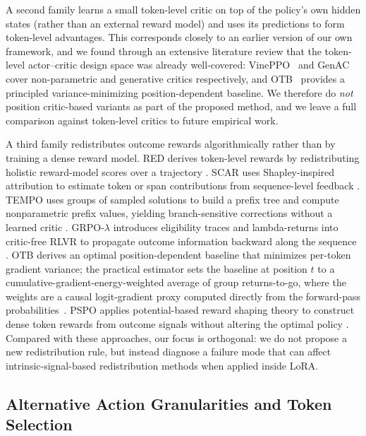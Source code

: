 A second family learns a small token-level critic on top of the policy's own hidden
states (rather than an external reward model) and uses its predictions to form
token-level advantages. This corresponds closely to an earlier version of our own
framework, and we found through an extensive literature review that the token-level
actor--critic design space was already well-covered: VinePPO~\cite{kazemnejad2024vineppo}
and GenAC~\cite{shan2026genac} cover non-parametric and generative critics
respectively, and OTB~\cite{li2026otb} provides a principled variance-minimizing
position-dependent baseline. We therefore do \emph{not} position critic-based
variants as part of the proposed method, and we leave a full comparison against
token-level critics to future empirical work.

A third family redistributes outcome rewards algorithmically rather than by training a
dense reward model. RED derives token-level rewards by redistributing holistic
reward-model scores over a trajectory \cite{li2024red}. SCAR uses Shapley-inspired
attribution to estimate token or span contributions from sequence-level feedback
\cite{cao2025scar,shapley1953value}. TEMPO uses groups of sampled solutions to build a
prefix tree and compute nonparametric prefix values, yielding branch-sensitive
corrections without a learned critic \cite{tran2025tempo}. GRPO-$\lambda$ introduces
eligibility traces and lambda-returns into critic-free RLVR to propagate outcome
information backward along the sequence \cite{parthasarathi2025grpolambda}. OTB derives
an optimal position-dependent baseline that minimizes per-token gradient
variance; the practical estimator sets the baseline at position $t$ to a
cumulative-gradient-energy-weighted average of group returns-to-go, where the
weights are a causal logit-gradient proxy computed directly from the
forward-pass probabilities~\cite{li2026otb}. PSPO applies potential-based reward
shaping theory to construct dense token rewards from outcome signals without altering
the optimal policy \cite{hu2026pspo}. Compared with these approaches, our focus is
orthogonal: we do not propose a new redistribution rule, but instead diagnose a failure
mode that can affect intrinsic-signal-based redistribution methods when
applied inside LoRA.

\subsection{Alternative Action Granularities and Token Selection}


